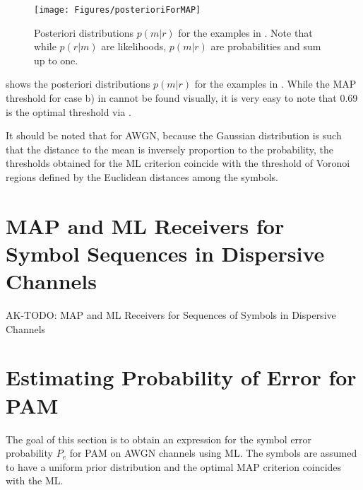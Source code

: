 \begin{figure}[htbp]
\centering
\texttt{[image: Figures/posterioriForMAP]}
\caption[{Posteriori distributions $p(m|r)$ for the examples in .}]{Posteriori distributions $p(m|r)$ for the examples in . Note that while $p(r|m)$ are likelihoods, $p(m|r)$ are probabilities and sum up to one.\label{fig:posterioriForMAP}}
\end{figure}

 shows the posteriori distributions $p(m|r)$ for the examples in . While the MAP threshold for case b) in  cannot be found visually, it is very easy to note that 0.69 is the optimal threshold via .

It should be noted that for AWGN, because the Gaussian distribution is such that the distance to the mean is inversely proportion to the probability, the thresholds obtained for the ML criterion coincide with the threshold of Voronoi regions defined by the Euclidean distances among the symbols.

\section{MAP and ML Receivers for Symbol Sequences in Dispersive Channels}
\label{sec:mapMLESequence}

AK-TODO: MAP and ML Receivers for Sequences of Symbols in Dispersive Channels

\section{Estimating Probability of Error for PAM}

The goal of this section is to obtain an expression for the symbol error probability $P_e$ for PAM on AWGN channels using ML. The symbols are assumed to have a uniform prior distribution and the optimal MAP criterion coincides with the ML.

